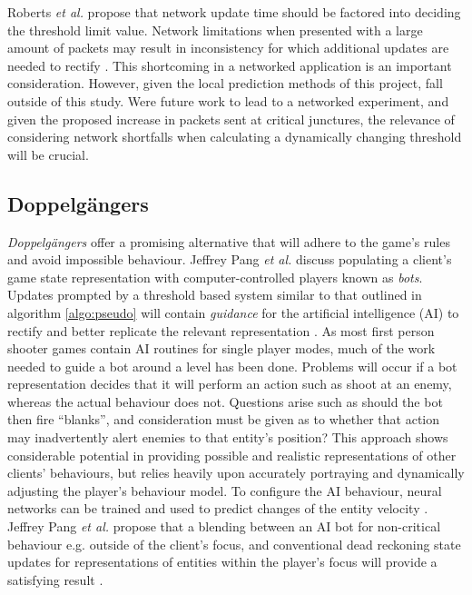 \documentclass[journal]{IEEEtran}
\begin{document}
Roberts \textit{et al.} propose that network update time should be factored into deciding the threshold limit value. Network limitations when presented with a large amount of packets may result in inconsistency for which additional updates are needed to rectify \cite{roberts2008bounding}. This shortcoming in a networked application is an important consideration. However, given the local prediction methods of this project, fall outside of this study. Were future work to lead to a networked experiment, and given the proposed increase in packets sent at critical junctures, the relevance of considering network shortfalls when calculating a dynamically changing threshold will be crucial.




\subsection{Doppelg\"{a}ngers}

\textit{Doppelg\"{a}ngers} offer a promising alternative that will adhere to the game's rules and avoid impossible behaviour. Jeffrey Pang \textit{et al.} discuss populating a client's game state representation with computer-controlled players known as \textit{bots}. Updates prompted by a threshold based system similar to that outlined in algorithm \ref{algo:pseudo} will contain \textit{guidance} for the artificial intelligence (AI) to rectify and better replicate the relevant representation \cite{pang2007scaling} \cite{bharambe2008donnybrook}. As most first person shooter games contain AI routines for single player modes, much of the work needed to guide a bot around a level has been done. Problems will occur if a bot representation decides that it will perform an action such as shoot at an enemy, whereas the actual behaviour does not. Questions arise such as should the bot then fire ``blanks'', and consideration must be given as to whether that action may inadvertently alert enemies to that entity's position? This approach shows considerable potential in providing possible and realistic representations of other clients' behaviours, but relies heavily upon accurately portraying and dynamically adjusting the player's behaviour model. To configure the AI behaviour, neural networks can be trained and used to predict changes of the entity velocity \cite{mccoy2007multistep}. Jeffrey Pang \textit{et al.} propose that a blending between an AI bot for non-critical behaviour e.g. outside of the client's focus, and conventional dead reckoning state updates for representations of entities within the player's focus will provide a satisfying result \cite{pang2007scaling}.
\end{document}
